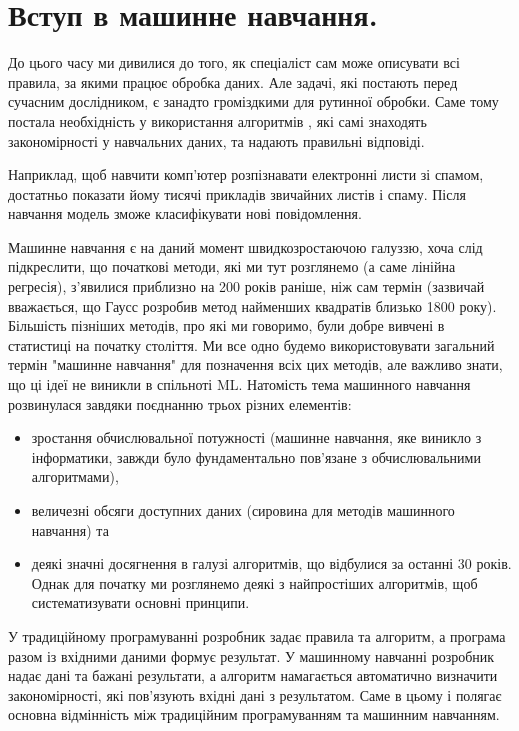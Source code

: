 \chapter{Вступ в машинне навчання.}

До цього часу ми дивилися до того, як спеціаліст сам може описувати всі правила, за якими працює обробка даних. Але задачі, які постають перед сучасним дослідником, є занадто громіздкими для рутинної обробки. Саме тому постала необхідність у використання алгоритмів , які самі знаходять закономірності у навчальних даних, та надають правильні відповіді.

Наприклад, щоб навчити комп'ютер розпізнавати електронні листи зі спамом, достатньо показати йому тисячі прикладів звичайних листів і спаму. Після навчання модель зможе класифікувати нові повідомлення.

Машинне навчання є на даний момент швидкозростаючою галуззю, хоча слід підкреслити, що початкові методи, які ми тут розглянемо (а саме лінійна регресія), з'явилися приблизно на 200 років раніше, ніж сам термін (зазвичай вважається, що Гаусс розробив метод найменших квадратів близько 1800 року). Більшість пізніших методів, про які ми говоримо, були добре вивчені в статистиці на початку століття. Ми все одно будемо використовувати загальний термін "машинне навчання" для позначення всіх цих методів, але важливо знати, що ці ідеї не виникли в спільноті ML. Натомість тема машинного навчання розвинулася завдяки поєднанню трьох різних елементів: 

\begin{itemize}
\item зростання обчислювальної потужності (машинне навчання, яке виникло з інформатики, завжди було фундаментально пов'язане з обчислювальними алгоритмами), 
\item величезні обсяги доступних даних (сировина для методів машинного навчання) та 
\item деякі значні досягнення в галузі алгоритмів, що відбулися за останні 30 років. Однак для початку ми розглянемо деякі з найпростіших алгоритмів, щоб систематизувати основні принципи.
\end{itemize}

У традиційному програмуванні розробник задає правила та алгоритм, а програма разом із вхідними даними формує результат. У машинному навчанні розробник надає дані та бажані результати, а алгоритм намагається автоматично визначити закономірності, які пов'язують вхідні дані з результатом. Саме в цьому і полягає основна відмінність між традиційним програмуванням та машинним навчанням.

